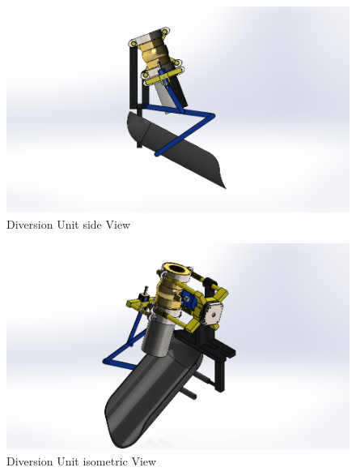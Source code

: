 \begin{figure}[ht]
\includegraphics[width=0.9\linewidth]{Figures/DiversionUnit_side.png}
\centering
\caption{Diversion Unit side View }
\label{fig:Diversion Unit_side}
\end{figure}

\begin{figure}[ht]
\includegraphics[width=0.9\linewidth]{Figures/DiversionUnit_isometric.png}
\centering
\caption{Diversion Unit isometric View }
\label{fig:Diversion Unit isometric}
\end{figure}




